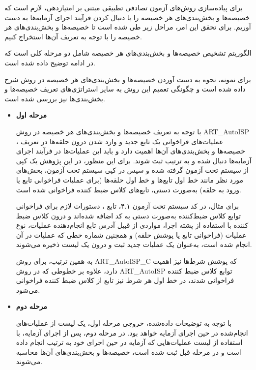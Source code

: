 برای پیاده‌سازی روش‌های آزمون تصادفی تطبیقی مبتنی بر امتیازدهی، لازم است که خصیصه‌ها و بخش‌بندی‌های هر خصیصه را با دنبال کردن فرآیند اجرای آزمایه‌ها به دست آوریم. برای تحقق این امر، مراحل زیر طی شده است تا خصیصه‌ها و بخش‌بندی‌های هر خصیصه را با توجه به تعریف آن‌ها استخراج کنیم.

الگوریتم تشخیص خصیصه‌ها و بخش‌بندی‌های هر خصیصه شامل دو مرحله کلی است که در ادامه توضیح داده شده است.

برای نمونه، نحوه به دست آوردن خصیصه‌ها و بخش‌بندی‌های هر خصیصه در روش  شرح داده شده است و چگونگی تعمیم این روش به سایر استراتژی‌های تعریف خصیصه‌ها و بخش‌بندی‌ها نیز بررسی شده است.

\begin{itemize}
	\item\textbf{مرحله اول}

با توجه به تعریف خصیصه‌ها و بخش‌بندی‌های هر خصیصه در روش ART\_AutoISP ، عملیات‌های فراخوانی یک تابع جدید و وارد شدن درون حلقه‌ها در تعریف خصیصه‌ها و بخش‌بندی‌های آن‌ها اهمیت دارد و باید این عملیات‌ها در فرآیند اجرای آزمایه‌ها دنبال شده و به ترتیب ثبت شوند. برای این منظور، در این پژوهش یک کپی از سیستم تحت آزمون گرفته شده و سپس در کپی سیستم تحت آزمون، بخش‌های مورد نظر مانند خط اول تابع‌ها و خط اول حلقه‌ها (برای عملیات فراخوانی تابع یا ورود به حلقه) به‌صورت دستی، تابع‌های کلاس ضبط کننده فراخوانی شده است.

برای مثال، در کد سیستم تحت آزمون ۴.۱، تابع ، دستورات لازم برای فراخوانی توابع کلاس ضبط‌کننده به‌صورت دستی به کد اضافه شده‌اند و درون کلاس ضبط کننده با استفاده از پشته اجرا، مواردی از قبیل آدرس تابع انجام‌دهنده عملیات، نوع عملیات (فراخوانی تابع یا پوشش حلقه) و همچنین شماره خطی که عملیات در آن انجام شده است، به‌عنوان یک عملیات جدید ثبت و درون یک لیست ذخیره می‌شوند.

\newpage
\begin{figure}[!h]
	\begin{LTR}
		\singlespacing
		
	\end{LTR}
\end{figure}

به همین ترتیب، برای روش ART\_AutoISP\_C که پوشش شرط‌ها نیز اهمیت دارد، علاوه بر خطوطی که در روش ART\_AutoISP توابع کلاس ضبط کننده فراخوانی شدند، در خط اول هر شرط نیز تابع  از کلاس ضبط کننده فراخوانی می‌شود.

	\item \textbf{مرحله دوم}

با توجه به توضیحات داده‌شده، خروجی مرحله اول، یک لیست از عملیات‌های انجام‌شده در حین اجرای آزمایه خواهد بود. در مرحله دوم، پس از اجرای آزمایه، با استفاده از لیست عملیات‌هایی که آزمایه در حین اجرای خود به ترتیب انجام داده است و در مرحله قبل ثبت شده است، خصیصه‌ها و بخش‌بندی‌های آن‌ها محاسبه می‌شوند.

\end{itemize}

